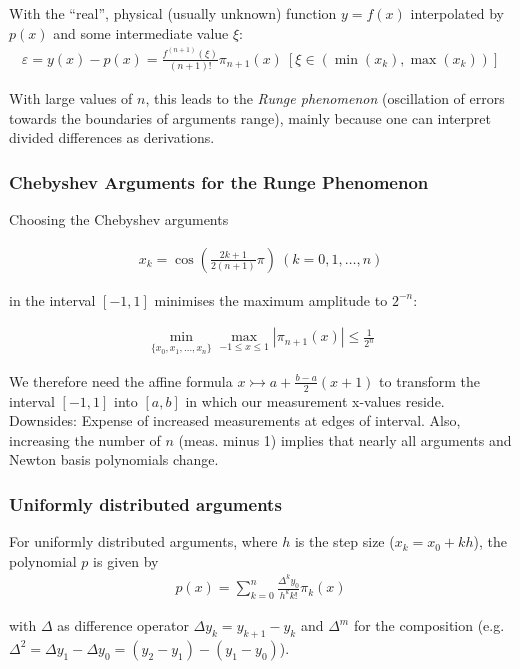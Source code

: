 With the ``real'', physical (usually unknown) function $y=f(x)$ interpolated by $p(x)$ and some intermediate value $\xi$:
\begin{align*}
	\varepsilon = y(x)-p(x)=\frac{f^{(n+1)}(\xi)}{(n+1)!}\pi_{n+1}(x)\ \left[\xi\in \left(\min(x_k),\max(x_k)\right)\right]
\end{align*}

With large values of $n$, this leads to the \emph{Runge phenomenon} (oscillation of errors towards the boundaries of arguments range),
mainly because one can interpret divided differences as derivations.

\subsubsection{Chebyshev Arguments for the Runge Phenomenon}

Choosing the Chebyshev arguments

\begin{align*}
	x_k = \cos\left( \frac{2k+1}{2(n+1)}\pi \right)\ (k=0,1,\ldots,n)
\end{align*}

in the interval $[-1,1]$ minimises the maximum amplitude to $2^{-n}$:

\begin{align*}
	\min_{\{x_0,x_1,\ldots,x_n\}}\max_{-1\leq x \leq 1} \left|\pi_{n+1}(x)\right| \leq \frac{1}{2^n}
\end{align*}

We therefore need the affine formula $x\rightarrowtail a+\frac{b-a}{2}(x+1)$
to transform the interval $[-1,1]$ into $[a,b]$ in which our measurement x-values reside.
Downsides: Expense of increased measurements at edges of interval.
Also, increasing the number of $n$ (meas. minus 1) implies that nearly all arguments and Newton basis polynomials change.

\subsubsection{Uniformly distributed arguments}

For uniformly distributed arguments, where $h$ is the step size ($x_k = x_0 + kh$),
the polynomial $p$ is given by
\begin{align*}
	p(x) = \sum_{k=0}^n \frac{\Delta^k y_0}{h^kk!}\pi_k(x)
\end{align*}

with $\Delta$ as difference operator $\Delta y_k=y_{k+1} - y_k$ 
and $\Delta^m$ for the composition (e.g. $\Delta^2 = \Delta y_1 - \Delta y_0 = (y_2-y_1) - (y_1-y_0)$).

